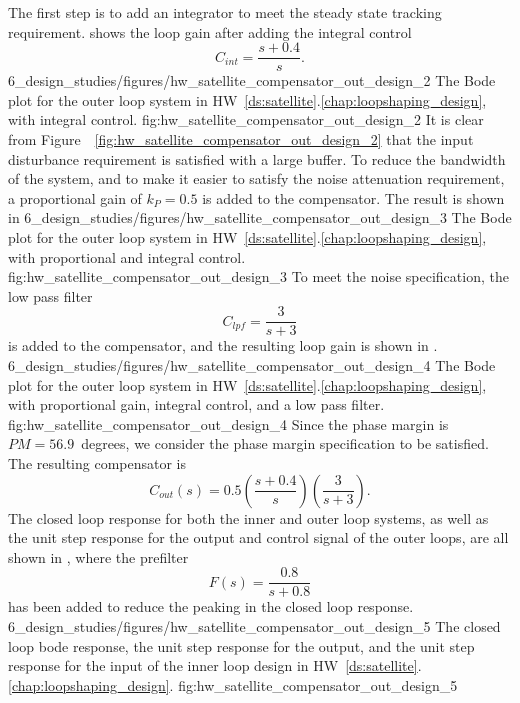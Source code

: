 The first step is to add an integrator to meet the steady state tracking requirement.   shows the loop gain after adding the integral control
\[
C_{int} = \frac{s+0.4}{s}.
\]
	{6_design_studies/figures/hw_satellite_compensator_out_design_2}
   	{The Bode plot for the outer loop system in HW~\ref{ds:satellite}.\ref{chap:loopshaping_design}, with integral control.}
   	{fig:hw_satellite_compensator_out_design_2}
It is clear from Figure~~\ref{fig:hw_satellite_compensator_out_design_2} that the input disturbance requirement is satisfied with a large buffer.  To reduce the bandwidth of the system, and to make it easier to satisfy the noise attenuation requirement, a proportional gain of $k_P=0.5$ is added to the compensator.  The result is shown in 
	{6_design_studies/figures/hw_satellite_compensator_out_design_3}
   	{The Bode plot for the outer loop system in HW~\ref{ds:satellite}.\ref{chap:loopshaping_design}, with proportional and integral control.}
   	{fig:hw_satellite_compensator_out_design_3}
To meet the noise specification, the low pass filter
\[
C_{lpf} = \frac{3}{s+3}
\]
is added to the compensator, and the resulting loop gain is shown in .
	{6_design_studies/figures/hw_satellite_compensator_out_design_4}
   	{The Bode plot for the outer loop system in HW~\ref{ds:satellite}.\ref{chap:loopshaping_design}, with proportional gain, integral control, and a low pass  filter.}
   	{fig:hw_satellite_compensator_out_design_4}
Since the phase margin is $PM=56.9$~degrees, we consider the phase margin specification to be satisfied.
The resulting compensator is
\[
C_{out}(s) = 0.5\left(\frac{s+0.4}{s}\right)\left(\frac{3}{s+3}\right).
\]
The closed loop response for both the inner and outer loop systems, 
as well as the unit step response for the output and control signal of the outer loops, are all shown in , where the prefilter
\[
F(s) = \frac{0.8}{s+0.8}
\]
has been added to reduce the peaking in the closed loop response.
	{6_design_studies/figures/hw_satellite_compensator_out_design_5}
   	{The closed loop bode response, the unit step response for the output, and the unit step response for the input of the inner loop design in HW~\ref{ds:satellite}.\ref{chap:loopshaping_design}.}
   	{fig:hw_satellite_compensator_out_design_5}


